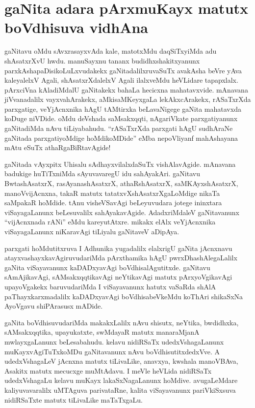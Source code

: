 \chapter{gaNita adara pArxmuKayx matutx boVdhisuva vidhAna}

gaNitavu oMdu sAvxrasayxvAda kale, matotxMdu daqSiTxyiMda adu shAsatxrXvU hwdu. manuSayxnu tananx budidhxshakitxyanunx parxkAshapaDisikoLuLxvudakekx gaNitadalilxruvaSuTx avakAsha beVre yAva kaleyalelxV Agali, shAsatxrXdalelxV Agali ilalxveMdu heVLidare tapapxlalx. pArxciVna kAladiMdalU gaNitakekx bahaLa hecicxna mahatavxvide. mAnavana jiVvanadalilx vayxvahArakekx, aMkisaMKeyxgaLa lekAkxcArakekx, rASaTxrXda parxgatige, veYjAcnxnika hAgU tAMtirxka beLavaNigege gaNita mahatavxda koDuge niVDide. oMdu deVshada saMsakxqqti, nAgariVkate parxgatiyanunx gaNitadiMda nAvu tiLiyabahudu. ``rASaTxrXda parxgati hAgU sudhAraNe gaNitada parxgatiyoMdige hoMdikoMDide'' eMba nepoVliyanf mahAshayana mAtu eSuTx athaRgaBiRtavAgide!

gaNitada vAyxpitx Uhisalu sAdhayxvilalxdaSuTx vishAlavAgide. mAnavana badukige huTiTxniMda sAyuvavaregU idu sahAyakAri. gaNitavu BwtashAsatxrX, rasAyanashAsatxrX, athaRshAsatxrX, saMKAyxshAsatxrX, manoVvijAcnxna, takaR matutx tatatxvXshAsatxrXgaLoMdige nikaTa saMpakaR hoMdide. tAnu visheVSavAgi beLeyuvudara jotege ininxtara viSayagaLanunx beLesuvalilx sahAyakavAgide. AdadxriMdaleV gaNitavanunx ``vijAcnxnada rANi'' eMdu kareyutAtxre. mikakx elAlx veYjAcnxnika viSayagaLanunx niKaravAgi tiLiyalu gaNitaveV aDipAya.

parxgati hoMdutitxruva I Adhunika yugadalilx elalxrigU gaNita jAcnxnavu atayxvashayxkavAgiruvudariMda pArxthamika hAgU pwrxDhashAlegaLalilx gaNita viSayavanunx kaDADxyavAgi boVdhisalAgutitxde. gaNitavu sAmAjikavAgi, sAMsakxqqtikavAgi neYtikavAgi matutx pArxyoVgikavAgi upayoVgakekx baruvudariMda I viSayavanunx hatutx vaSaRda shAlA paThayxkarxmadalilx kaDADxyavAgi boVdhisabeVkeMdu koThAri shikaSxNa AyoVgavu shiPArasusx mADide.

gaNita boVdhisuvudariMda makakxLalilx nAvu shisutx, neYtika, bwdidhxka, sAMsakxqqtika, upayukatxte, swMdayaR matutx manaraMjanA mwlayxgaLanunx beLesabahudu. kelavu nidiRSaTx udedxVshagaLanunx muKayxvAgiTuTxkoMDu gaNitavanunx nAvu boVdhisutitxdedxVve. A udedxVshagaLeV jAcnxna matutx tiLivaLike, anavxya, kwshala manoVBAva, Asakitx matutx mecucxge muMtAdavu. I meVle heVLida nidiRSaTx udedxVshagaLu kelavu muKayx lakaSxNa\-gaLanunx hoMdive. avugaLeMdare kaliyuvavaralilx uMTAguva parivataRne, kalita viSayavanunx pariVkiSxsuva nidiRSaTxte matutx tiLivaLike maTaTxgaLu.

